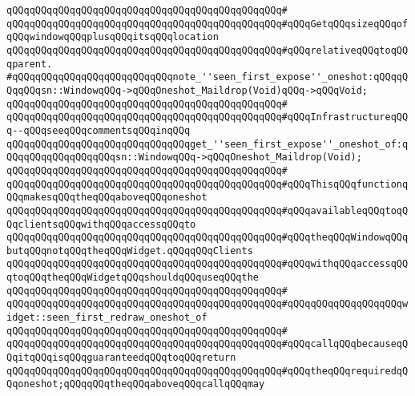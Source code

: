 \verb|qQQqqQQqqQQqqQQqqQQqqQQqqQQqqQQqqQQqqQQqqQQqqQQq#|\newline
\verb|qQQqqQQqqQQqqQQqqQQqqQQqqQQqqQQqqQQqqQQqqQQqqQQq#qQQqGetqQQqsizeqQQqofqQQqwindowqQQqplusqQQqitsqQQqlocation|\newline
\verb|qQQqqQQqqQQqqQQqqQQqqQQqqQQqqQQqqQQqqQQqqQQqqQQq#qQQqrelativeqQQqtoqQQqparent.|\newline
\newline
\verb|#qQQqqQQqqQQqqQQqqQQqqQQqqQQqnote_''seen_first_expose''_oneshot:qQQqqQQqqQQqsn::WindowqQQq->qQQqOneshot_Maildrop(Void)qQQq->qQQqVoid;|\newline
\verb|qQQqqQQqqQQqqQQqqQQqqQQqqQQqqQQqqQQqqQQqqQQqqQQq#|\newline
\verb|qQQqqQQqqQQqqQQqqQQqqQQqqQQqqQQqqQQqqQQqqQQqqQQq#qQQqInfrastructureqQQq--qQQqseeqQQqcommentsqQQqinqQQq|\newline
\newline
\verb|qQQqqQQqqQQqqQQqqQQqqQQqqQQqqQQqget_''seen_first_expose''_oneshot_of:qQQqqQQqqQQqqQQqqQQqsn::WindowqQQq->qQQqOneshot_Maildrop(Void);|\newline
\verb|qQQqqQQqqQQqqQQqqQQqqQQqqQQqqQQqqQQqqQQqqQQqqQQq#|\newline
\verb|qQQqqQQqqQQqqQQqqQQqqQQqqQQqqQQqqQQqqQQqqQQqqQQq#qQQqThisqQQqfunctionqQQqmakesqQQqtheqQQqaboveqQQqoneshot|\newline
\verb|qQQqqQQqqQQqqQQqqQQqqQQqqQQqqQQqqQQqqQQqqQQqqQQq#qQQqavailableqQQqtoqQQqclientsqQQqwithqQQqaccessqQQqto|\newline
\verb|qQQqqQQqqQQqqQQqqQQqqQQqqQQqqQQqqQQqqQQqqQQqqQQq#qQQqtheqQQqWindowqQQqbutqQQqnotqQQqtheqQQqWidget.qQQqqQQqClients|\newline
\verb|qQQqqQQqqQQqqQQqqQQqqQQqqQQqqQQqqQQqqQQqqQQqqQQq#qQQqwithqQQqaccessqQQqtoqQQqtheqQQqWidgetqQQqshouldqQQquseqQQqthe|\newline
\verb|qQQqqQQqqQQqqQQqqQQqqQQqqQQqqQQqqQQqqQQqqQQqqQQq#|\newline
\verb|qQQqqQQqqQQqqQQqqQQqqQQqqQQqqQQqqQQqqQQqqQQqqQQq#qQQqqQQqqQQqqQQqqQQqwidget::seen_first_redraw_oneshot_of|\newline
\verb|qQQqqQQqqQQqqQQqqQQqqQQqqQQqqQQqqQQqqQQqqQQqqQQq#|\newline
\verb|qQQqqQQqqQQqqQQqqQQqqQQqqQQqqQQqqQQqqQQqqQQqqQQq#qQQqcallqQQqbecauseqQQqitqQQqisqQQqguaranteedqQQqtoqQQqreturn|\newline
\verb|qQQqqQQqqQQqqQQqqQQqqQQqqQQqqQQqqQQqqQQqqQQqqQQq#qQQqtheqQQqrequiredqQQqoneshot;qQQqqQQqtheqQQqaboveqQQqcallqQQqmay|\newline
